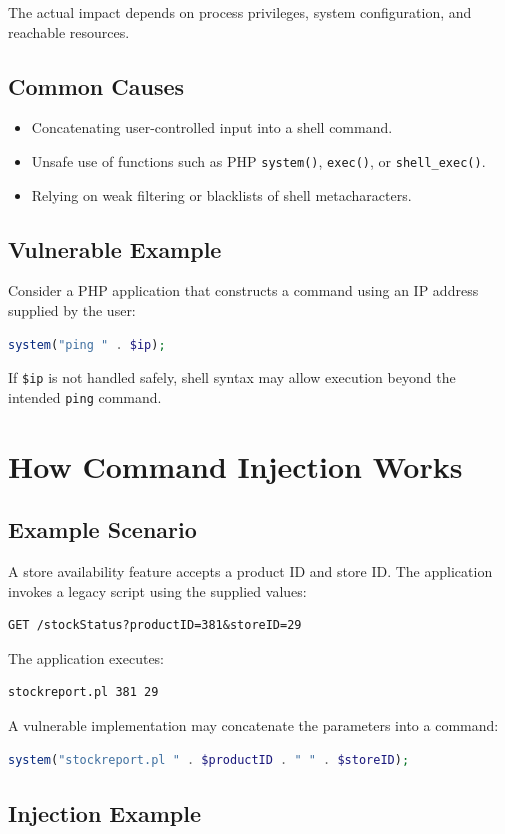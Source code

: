 \documentclass[12pt,a4paper]{article}
\newcommand{\nsection}[1]{\section{#1}}
\newcommand{\nsubsection}[1]{\subsection{#1}}
\begin{document}
The actual impact depends on process privileges, system
configuration, and reachable resources.

\vspace{0.5cm}
\nsubsection{Common Causes}

\begin{itemize}
    \item Concatenating user-controlled input into a shell command.
    \item Unsafe use of functions such as PHP \texttt{system()},
          \texttt{exec()}, or \texttt{shell\_exec()}.
    \item Relying on weak filtering or blacklists of shell metacharacters.
\end{itemize}

\vspace{0.5cm}
\nsubsection{Vulnerable Example}

Consider a PHP application that constructs a command using
an IP address supplied by the user:

\begin{lstlisting}[language=PHP]
system("ping " . $ip);
\end{lstlisting}

If \texttt{\$ip} is not handled safely, shell syntax may allow
execution beyond the intended \texttt{ping} command.

\newpage
\nsection{How Command Injection Works}

\vspace{0.5cm}
\nsubsection{Example Scenario}

A store availability feature accepts a product ID and store ID.
The application invokes a legacy script using the supplied values:

\begin{lstlisting}
GET /stockStatus?productID=381&storeID=29
\end{lstlisting}

The application executes:

\begin{lstlisting}
stockreport.pl 381 29
\end{lstlisting}

A vulnerable implementation may concatenate the parameters
into a command:

\begin{lstlisting}[language=PHP]
system("stockreport.pl " . $productID . " " . $storeID);
\end{lstlisting}

\vspace{0.5cm}
\nsubsection{Injection Example}
\end{document}
